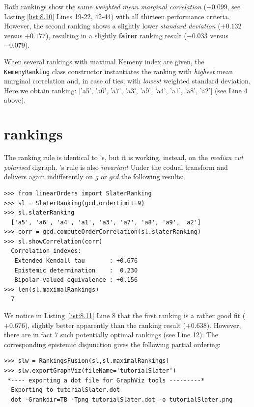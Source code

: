 Both \Kemeny rankings show the same \emph{weighted mean marginal correlation} ($+0.099$, see Listing \ref{list:8.10} Lines 19-22, 42-44) with all thirteen performance criteria. However, the second ranking shows a slightly lower \emph{standard deviation} ($+0.132$ versus $+0.177$), resulting in a slightly \textbf{fairer} ranking result ($-0.033$ versus $-0.079$).

When several rankings with maximal Kemeny index are given, the \texttt{KemenyRanking} class constructor instantiates the ranking with \emph{highest} mean marginal correlation and, in case of ties, with \emph{lowest} weighted standard deviation. Here we obtain ranking: ['a5', 'a6', 'a7', 'a3', 'a9', 'a4', 'a1', 'a8', 'a2'] (see Line 4 above).

\section{\Slater rankings}
\label{sec:8.5}

The \Slater ranking rule is identical to \Kemeny 's, but it is working, instead, on the \emph{median cut polarised} digraph. \Slater 's rule is also \emph{invariant} Under the codual transform and delivers again indifferently on $g$ or $gcd$ the following results:

\begin{lstlisting}[caption={Computing a \Slater ranking},label=list:8.11]   
>>> from linearOrders import SlaterRanking
>>> sl = SlaterRanking(gcd,orderLimit=9)
>>> sl.slaterRanking
  ['a5', 'a6', 'a4', 'a1', 'a3', 'a7', 'a8', 'a9', 'a2']
>>> corr = gcd.computeOrderCorrelation(sl.slaterRanking)
>>> sl.showCorrelation(corr)
  Correlation indexes:
   Extended Kendall tau       : +0.676
   Epistemic determination    :  0.230
   Bipolar-valued equivalence : +0.156
>>> len(sl.maximalRankings)
  7
\end{lstlisting}

We notice in Listing \ref{list:8.11} Line 8 that the first \Slater ranking is a rather good fit ($+0.676$), slightly better apparently than the \NetFlows ranking result ($+0.638$). However, there are in fact 7 such potentially optimal \Slater rankings (see Line 12). The corresponding epistemic disjunction gives the following partial ordering:

\begin{lstlisting}[caption={Computing the epistemic disjunction of optimal \Slater rankings},label=list:8.12]   
>>> slw = RankingsFusion(sl,sl.maximalRankings)
>>> slw.exportGraphViz(fileName='tutorialSlater')
 *---- exporting a dot file for GraphViz tools ---------*
  Exporting to tutorialSlater.dot
  dot -Grankdir=TB -Tpng tutorialSlater.dot -o tutorialSlater.png
\end{lstlisting}

